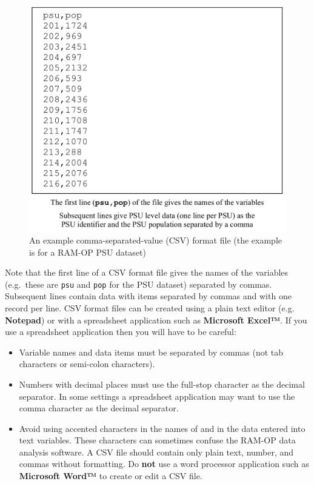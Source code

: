 \documentclass[12pt,a4paper]{book}
\theoremstyle{definition}
\theoremstyle{definition}
\theoremstyle{definition}
\theoremstyle{remark}
\begin{document}
\begin{figure}[H]

{\centering \includegraphics[width=16.22in]{figures/dataset02} 

}

\caption{An example comma-separated-value (CSV) format file (the example is for a RAM-OP PSU dataset)}\label{fig:dataset02}
\end{figure}

Note that the first line of a CSV format file gives the names of the
variables (e.g.~these are \texttt{psu} and \texttt{pop} for the PSU
dataset) separated by commas. Subsequent lines contain data with items
separated by commas and with one record per line. CSV format files can
be created using a plain text editor (e.g. \textbf{Notepad}) or with a
spreadsheet application such as \textbf{Microsoft Excel™}. If you use a
spreadsheet application then you will have to be careful:

\begin{itemize}
\item
  Variable names and data items must be separated by commas (not tab
  characters or semi-colon characters).
\item
  Numbers with decimal places must use the full-stop character as the
  decimal separator. In some settings a spreadsheet application may want
  to use the comma character as the decimal separator.
\item
  Avoid using accented characters in the names of and in the data
  entered into text variables. These characters can sometimes confuse
  the RAM-OP data analysis software. A CSV file should contain only
  plain text, number, and commas without formatting. Do \textbf{not} use
  a word processor application such as \textbf{Microsoft Word™} to
  create or edit a CSV file.
\end{itemize}
\end{document}
